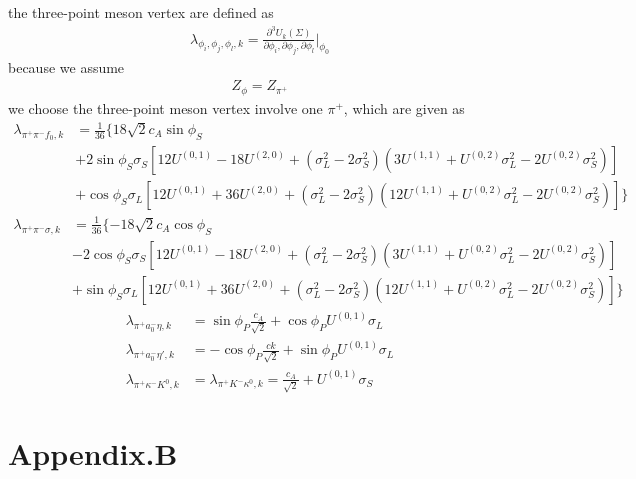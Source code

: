 \documentclass[12pt]{article}
\begin{document}
the three-point meson vertex are defined as
\begin{align}
\lambda_{\phi_i,\phi_j,\phi_l,k}=\frac{\partial^3 U_k(\Sigma)}{\partial \phi_i,\partial \phi_j,\partial \phi_l}\bigg |_{\phi_0}
\end{align}
because we assume
\begin{align}
Z_\phi=Z_{\pi^+}
\end{align}
we choose the three-point meson vertex involve one $\pi^+$, which are given as
\begin{align}
\lambda_{\pi^+\pi^-f_0,k}&=\frac{1}{36}\{18 \sqrt{2} c_A \sin \phi_S  \\ \nonumber
&+ 2 \sin\phi_S \sigma_S [12 U^{(0,1)} - 18 U^{(2,0)}+ (\sigma_L^2 - 2 \sigma_S^2) (3 U^{(1,1)} +  U^{(0,2)} \sigma_L^2 - 2 U^{(0,2)} \sigma_S^2)] \\ \nonumber
& +\cos\phi_S \sigma_L [12 U^{(0,1)} +  36 U^{(2,0)} + (\sigma_L^2 - 2 \sigma_S^2) (12 U^{(1,1)} +  U^{(0,2)} \sigma_L^2 - 2 U^{(0,2)} \sigma_S^2)]\}
\end{align}
\begin{align}
\lambda_{\pi^+\pi^-\sigma,k}&=\frac{1}{36}\{-18 \sqrt{2} c_A \cos\phi_S\\ \nonumber
&- 2 \cos\phi_S \sigma_S [12 U^{(0,1)} -  18 U^{(2,0)} + (\sigma_L^2 - 2 \sigma_S^2) (3 U^{(1,1)} + U^{(0,2)} \sigma_L^2 - 2 U^{(0,2)} \sigma_S^2)] \\ \nonumber
&+ \sin\phi_S \sigma_L [12 U^{(0,1)} + 36 U^{(2,0)} + (\sigma_L^2 - 2 \sigma_S^2) (12 U^{(1,1)} + U^{(0,2)} \sigma_L^2 - 2 U^{(0,2)} \sigma_S^2)]\}
\end{align}
\begin{align}
\lambda_{\pi^+a_0^-\eta,k}&=\sin\phi_P \frac{c_A} {\sqrt{2}} + \cos\phi_P U^{(0,1)} \sigma_L\\
\lambda_{\pi^+a_0^-\eta',k}&=-\cos\phi_P\frac{ck}{\sqrt{2}} + \sin\phi_P U^{(0,1)} \sigma_L\\
\lambda_{\pi^+\kappa^-K^0,k}&=\lambda_{\pi^+K^-\kappa^0,k}=\frac{c_A}{\sqrt{2}} + U^{(0,1)} \sigma_S
\end{align}
\section{Appendix.B}
\end{document}
